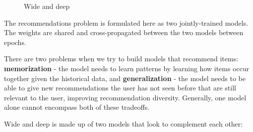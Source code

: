 \documentclass[11pt, table]{diazessay} %
\begin{document}
\begin{sloppypar}
\begin{figure}[H]
\caption{Wide and deep\citep{cheng2016wide}}
\end{figure}

The recommendations problem is formulated here as two jointly-trained models. The weights are shared and cross-propagated between the two models between epochs.

There are two problems when we try to build models that recommend items: \textbf{memorization} - the model needs to learn patterns by learning how items occur together given the historical data, and \textbf{generalization} - the model needs to be able to give new recommendations the user has not seen before that are still relevant to the user, improving recommendation diversity. Generally, one model alone cannot encompass both of these tradeoffs.  

Wide and deep is made up of two models that look to complement each other:


\end{sloppypar}
\end{document}
